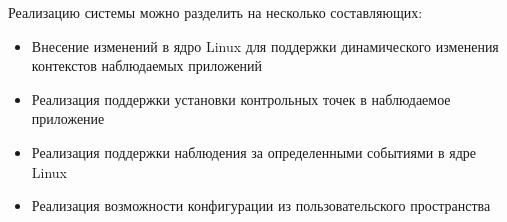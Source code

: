 Реализацию системы можно разделить на несколько составляющих:

\begin{itemize}

\item Внесение изменений в ядро Linux для поддержки динамического
        изменения контекстов наблюдаемых приложений

\item Реализация поддержки установки контрольных точек в наблюдаемое
        приложение

\item Реализация поддержки наблюдения за определенными событиями в
        ядре Linux

\item Реализация возможности конфигурации из пользовательского
        пространства
\end{itemize}





